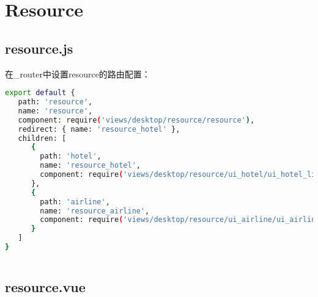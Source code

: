 \begin{lstlisting}[language=bash]

\end{lstlisting}



\begin{lstlisting}[language=bash]

\end{lstlisting}



\chapter{Resource}

\section{resource.js}

在\_router中设置resource的路由配置：


\begin{lstlisting}[language=bash]
export default {
   path: 'resource',
   name: 'resource',
   component: require('views/desktop/resource/resource'),
   redirect: { name: 'resource_hotel' },
   children: [
      {
        path: 'hotel',
        name: 'resource_hotel',
        component: require('views/desktop/resource/ui_hotel/ui_hotel_list')
      },
      {
        path: 'airline',
        name: 'resource_airline',
        component: require('views/desktop/resource/ui_airline/ui_airline_list')
      }
   ]
}
\end{lstlisting}



\begin{lstlisting}[language=bash]

\end{lstlisting}


\section{resource.vue}

